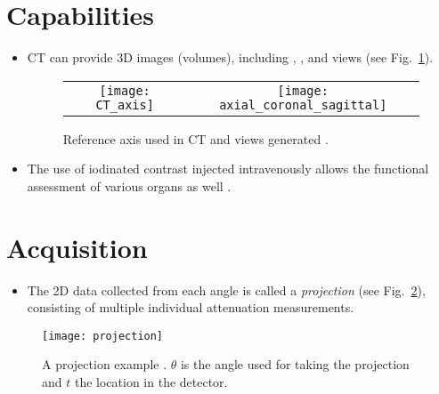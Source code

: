 \section{Capabilities}
\begin{itemize}
\item CT can provide  3D images (volumes), including
  , , and 
  views (see Fig.~\ref{fig:views_in_CT}).
\begin{figure}[H]
\vspace{-3ex}
  \centering
  \begin{tabular}{cc}
    \texttt{[image: CT\_axis]} & \texttt{[image: axial\_coronal\_sagittal]}
  \end{tabular}
  \caption{Reference axis used in CT and views generated
    \cite{morin2025radiation}.\label{fig:views_in_CT}}
\end{figure}
\item The use of
  iodinated contrast injected intravenously allows the functional
  assessment of various organs as well \cite{bushberg2011essential}.
\end{itemize}

\section{Acquisition}
\begin{itemize}
\item The 2D data collected from each angle is called a \emph{projection}
(see Fig.~\ref{fig:projection}), consisting of multiple individual
attenuation measurements.
\end{itemize}
\vspace{-1ex}
\begin{figure}[H]
  \centering
  \texttt{[image: projection]}
  \caption{A projection example \cite{takase2025CT}. $\theta$ is the
    angle used for taking the projection and $t$ the location in
    the detector.\label{fig:projection}}
\end{figure}


